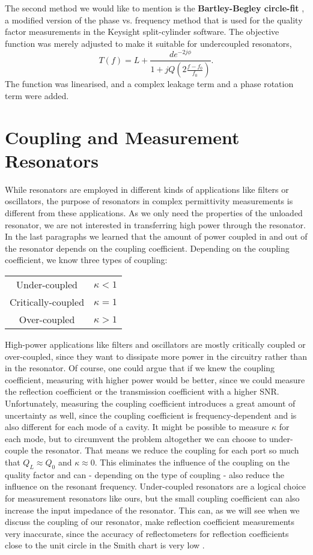 The second method we would like to mention is the \textbf{Bartley-Begley circle-fit} \cite{bartley}, a modified version of the phase vs. frequency method that is used for the quality factor measurements in the Keysight split-cylinder software. The objective function was merely adjusted to make it suitable for undercoupled resonators,
\begin{equation}
T(f)=L+\frac{de^{-2j\phi}}{1+jQ\left( 2\frac{f-f_0}{f_0}\right) }\text{.}
\end{equation}
The function was linearised, and a complex leakage term and a phase rotation term were added.
\section{Coupling and Measurement Resonators}
While resonators are employed in different kinds of applications like filters or oscillators, the purpose of resonators in complex permittivity measurements is different from these applications. As we only need the properties of the unloaded resonator, we are not interested in transferring high power through the resonator. In the last paragraphs we learned that the amount of power coupled in and out of the resonator depends on the coupling coefficient. Depending on the coupling coefficient, we know three types of coupling:

\begin{center}
\begin{tabular}{c c}
 Under-coupled & $\kappa<1$ \\ 
 Critically-coupled & $\kappa=1$ \\ 
 Over-coupled & $\kappa>1$ \\
\end{tabular}
\end{center}

High-power applications like filters and oscillators are mostly critically coupled or over-coupled, since they want to dissipate more power in the circuitry rather than in the resonator. Of course, one could argue that if we knew the coupling coefficient, measuring with higher power would be better, since we could measure the reflection coefficient or the transmission coefficient with a higher SNR. Unfortunately, measuring the coupling coefficient introduces a great amount of uncertainty as well, since the coupling coefficient is frequency-dependent and is also different for each mode of a cavity. It might be possible to measure $\kappa$ for each mode, but to circumvent the problem altogether we can choose to under-couple the resonator. That means we reduce the coupling for each port so much that $Q_L\approx Q_0$ and $\kappa\approx 0$. This eliminates the influence of the coupling on the quality factor and can - depending on the type of coupling - also reduce the influence on the resonant frequency. Under-coupled resonators are a logical choice for measurement resonators like ours, but the small coupling coefficient can also increase the input impedance of the resonator. This can, as we will see when we discuss the coupling of our resonator, make reflection coefficient measurements very inaccurate, since the accuracy of reflectometers for reflection coefficients close to the unit circle in the Smith chart is very low \cite{pozar,NPL,kajfez}.

